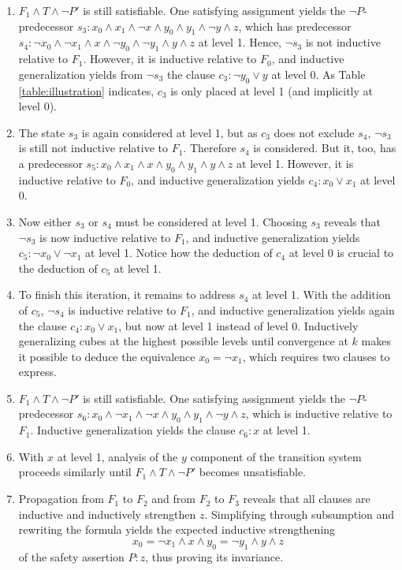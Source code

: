 \documentclass{llncs}
\newcommand{\band}{\wedge}
\newcommand{\bor}{\vee}
\newcommand{\bnot}{\neg}
\begin{document}
\begin{enumerate}
\item $F_{1} \band T \band \bnot P'$ is still satisfiable.  One
  satisfying assignment yields the $\bnot P$-predecessor $s_3: x_0
  \band x_1 \band \bnot x \band y_0 \band y_1 \band \bnot y \band z$,
  which has predecessor $s_4: \bnot x_0 \band \bnot x_1 \band x \band
  \bnot y_0 \band \bnot y_1 \band y \band z$ at level 1.  Hence,
  $\bnot s_3$ is not inductive relative to $F_{1}$.  However, it is
  inductive relative to $F_{0}$, and inductive generalization yields
  from $\bnot s_3$ the clause $c_3: \bnot y_0 \bor y$ at level 0.  As
  Table \ref{table:illustration} indicates, $c_3$ is only placed at
  level 1 (and implicitly at level 0).

\item The state $s_3$ is again considered at level 1, but as $c_3$
  does not exclude $s_4$, $\bnot s_3$ is still not inductive relative
  to $F_{1}$.  Therefore $s_4$ is considered.  But it, too, has a
  predecessor $s_5: x_0 \band x_1 \band x \band y_0 \band y_1 \band y
  \band z$ at level 1.  However, it is inductive relative to $F_{0}$,
  and inductive generalization yields $c_4: x_0 \bor x_1$ at level 0.

\item Now either $s_3$ or $s_4$ must be considered at level 1.
  Choosing $s_3$ reveals that $\bnot s_3$ is now inductive relative to
  $F_{1}$, and inductive generalization yields $c_5: \bnot x_0 \bor
  \bnot x_1$ at level 1.  Notice how the deduction of $c_4$ at level 0
  is crucial to the deduction of $c_5$ at level 1.

\item To finish this iteration, it remains to address $s_4$ at level
  1.  With the addition of $c_5$, $\bnot s_4$ is inductive relative to
  $F_{1}$, and inductive generalization yields again the clause $c_4:
  x_0 \bor x_1$, but now at level 1 instead of level 0.  Inductively
  generalizing cubes at the highest possible levels until convergence
  at $k$ makes it possible to deduce the equivalence $x_0 = \bnot
  x_1$, which requires two clauses to express.

\item $F_{1} \band T \band \bnot P'$ is still satisfiable.  One
  satisfying assignment yields the $\bnot P$-predecessor $s_6: x_0
  \band \bnot x_1 \band \bnot x \band y_0 \band y_1 \band \bnot y
  \band z$, which is inductive relative to $F_{1}$.  Inductive
  generalization yields the clause $c_6: x$ at level 1.

\item With $x$ at level 1, analysis of the $y$ component of the
  transition system proceeds similarly until $F_{1} \band T \band \bnot
  P'$ becomes unsatisfiable.

\item Propagation from $F_{1}$ to $F_{2}$ and from $F_{2}$ to $F_{3}$
  reveals that all clauses are inductive and inductively strengthen
  $z$.  Simplifying through subsumption and rewriting the formula
  yields the expected inductive strengthening
\[
x_0 = \bnot x_1 \band x \band y_0 = \bnot y_1 \band y \band z
\]
of the safety assertion $P: z$, thus proving its invariance.
\end{enumerate}
\end{document}
